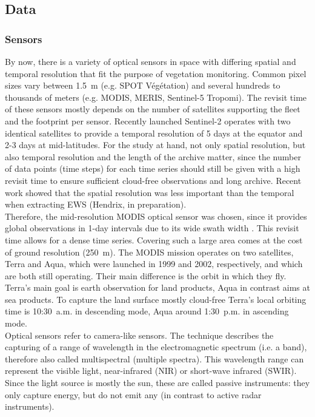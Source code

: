 \subsection{Data}\label{subsec:data}

\subsubsection{Sensors}
By now, there is a variety of optical sensors in space with differing spatial and temporal resolution that fit the purpose of vegetation monitoring. Common pixel sizes vary between 1.5~m (e.g. SPOT Végétation) and several hundreds to thousands of meters (e.g. MODIS, MERIS, Sentinel-5 Tropomi). The revisit time of these sensors mostly depends on the number of satellites supporting the fleet and the footprint per sensor. Recently launched Sentinel-2 operates with two identical satellites to provide a temporal resolution of 5 days at the equator and 2-3 days at mid-latitudes. For the study at hand, not only spatial resolution, but also temporal resolution and the length of the archive matter, since the number of data points (time steps) for each time series should still be given with a high revisit time to ensure sufficient cloud-free observations and long archive. Recent work showed that the spatial resolution was less important than the temporal when extracting EWS (Hendrix, in preparation).\\
Therefore, the mid-resolution MODIS optical sensor was chosen, since it provides global observations in 1-day intervals due to its wide swath width \citep{modisvcf}. This revisit time allows for a dense time series. Covering such a large area comes at the cost of ground resolution (250~m). The MODIS mission operates on two satellites, Terra and Aqua, which were launched in 1999 and 2002, respectively, and which are both still operating. Their main difference is the orbit in which they fly. Terra's main goal is earth observation for land products, Aqua in contrast aims at sea products. To capture the land surface mostly cloud-free Terra's local orbiting time is 10:30~a.m. in descending mode, Aqua around 1:30~p.m. in ascending mode.\\
Optical sensors refer to camera-like sensors. The technique describes the capturing of a range of wavelength in the electromagnetic spectrum (i.e. a band), therefore also called multispectral (multiple spectra). This wavelength range can represent the visible light, near-infrared (NIR) or short-wave infrared (SWIR). Since the light source is mostly the sun, these are called passive instruments: they only capture energy, but do not emit any (in contrast to active radar instruments).\\
